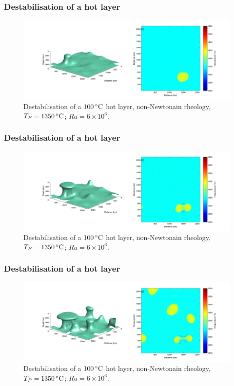 \documentclass[aspectratio=169]{beamer}
\begin{document}
\begin{frame}
    \frametitle{Destabilisation of a hot layer}
    \begin{figure}
        \vspace{-.5cm}
        \includegraphics[width=0.85\paperwidth]{./figures/100hot/100hotbase_1.png}
        \caption{Destabilisation of a $100\rm\,^{\circ}C$ hot layer, non-Newtonain rheology, $T_{P}=1350\rm\,^{\circ}C$; $Ra = 6\times10^{6}$.}
    \end{figure}
\end{frame}

\begin{frame}
    \frametitle{Destabilisation of a hot layer}
    \begin{figure}
        \vspace{-.5cm}
        \includegraphics[width=0.85\paperwidth]{./figures/100hot/100hotbase_2.png}
        \caption{Destabilisation of a $100\rm\,^{\circ}C$ hot layer, non-Newtonain rheology, $T_{P}=1350\rm\,^{\circ}C$; $Ra = 6\times10^{6}$.}
    \end{figure}
\end{frame}

\begin{frame}
    \frametitle{Destabilisation of a hot layer}
    \begin{figure}
        \vspace{-.5cm}
        \includegraphics[width=0.85\paperwidth]{./figures/100hot/100hotbase_3.png}
        \caption{Destabilisation of a $100\rm\,^{\circ}C$ hot layer, non-Newtonain rheology, $T_{P}=1350\rm\,^{\circ}C$; $Ra = 6\times10^{6}$.}
    \end{figure}
\end{frame}
\end{document}
